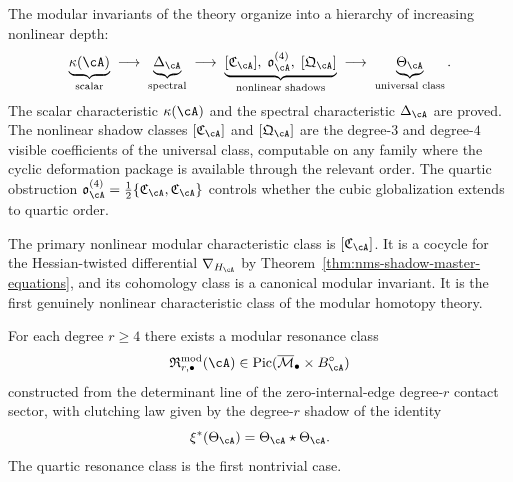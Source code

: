 \begin{remark}
\label{rem:nms-characteristic-hierarchy}
The modular invariants of the theory organize into a hierarchy of increasing nonlinear depth:
\[
\underbrace{\kappa(\cA)}_{\text{scalar}}
\;\longrightarrow\;
\underbrace{\Delta_{\cA}}_{\text{spectral}}
\;\longrightarrow\;
\underbrace{[\mathfrak C_{\cA}],\; \mathfrak o_{\cA}^{(4)},\; [\mathfrak Q_{\cA}]}_{\text{nonlinear shadows}}
\;\longrightarrow\;
\underbrace{\Theta_{\cA}}_{\text{universal class}}.
\]
The scalar characteristic $\kappa(\cA)$ and the spectral characteristic $\Delta_{\cA}$ are proved. The nonlinear shadow classes $[\mathfrak C_{\cA}]$ and $[\mathfrak Q_{\cA}]$ are the degree-$3$ and degree-$4$ visible coefficients of the universal class, computable on any family where the cyclic deformation package is available through the relevant order. The quartic obstruction $\mathfrak o_{\cA}^{(4)} = \frac12\{\mathfrak C_{\cA},\mathfrak C_{\cA}\}$ controls whether the cubic globalization extends to quartic order.

The primary nonlinear modular characteristic class is $[\mathfrak C_{\cA}]$. It is a cocycle for the Hessian-twisted differential $\nabla_{H_{\cA}}$ by Theorem~\ref{thm:nms-shadow-master-equations}, and its cohomology class is a canonical modular invariant. It is the first genuinely nonlinear characteristic class of the modular homotopy theory.
\end{remark}

\begin{theorem}
\label{thm:nms-full-resonance-tower}%
For each degree $r\ge 4$ there exists a modular resonance class
\[
\mathfrak R_{r,\bullet}^{\mathrm{mod}}(\cA)
\in \operatorname{Pic}(\overline{\mathcal M}_{\bullet}\times B_{\cA}^{\circ})
\]
constructed from the determinant line of the zero-internal-edge degree-$r$ contact sector, with clutching law given by the degree-$r$ shadow of the identity
\[
\xi^*(\Theta_{\cA})=\Theta_{\cA}\star \Theta_{\cA}.
\]
The quartic resonance class is the first nontrivial case.
\end{theorem}

